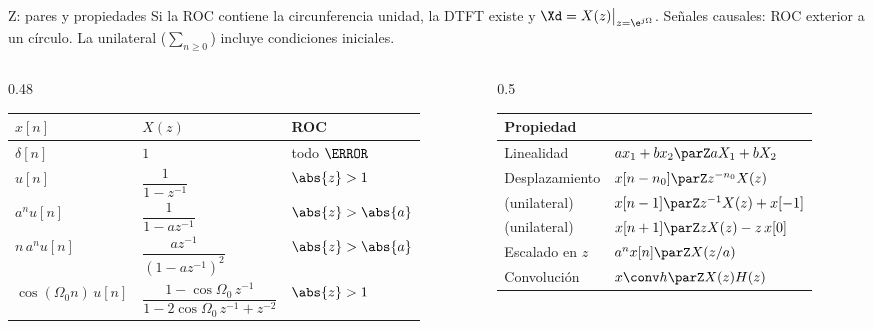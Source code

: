\documentclass[aspectratio=169,11pt]{beamer}
\begin{document}
\begin{frame}{Z: pares y propiedades}
  \small
  Si la ROC contiene la circunferencia unidad, la DTFT existe y $\Xd=X(z)\big|_{z=\e^{j\Omega}}$. Señales causales: ROC exterior a un círculo. La unilateral ($\sum_{n\ge0}$) incluye condiciones iniciales.
  \medskip
  \begin{columns}[T]
    \begin{column}{0.48\textwidth}
      \footnotesize
      \renewcommand{\arraystretch}{1.3}
      \begin{tabular}{@{}lll@{}}
        \toprule
        $x[n]$ & $X(z)$ & ROC\\\midrule
        $\delta[n]$ & $1$ & todo $\C$\\
        $u[n]$ & $\dfrac{1}{1-z^{-1}}$ & $\abs{z}>1$\\
        $a^nu[n]$ & $\dfrac{1}{1-az^{-1}}$ & $\abs{z}>\abs{a}$\\
        $n\,a^nu[n]$ & $\dfrac{az^{-1}}{(1-az^{-1})^2}$ & $\abs{z}>\abs{a}$\\
        $\cos(\Omega_0n)\,u[n]$ & $\dfrac{1-\cos\Omega_0\,z^{-1}}{1-2\cos\Omega_0\,z^{-1}+z^{-2}}$ & $\abs{z}>1$\\\bottomrule
      \end{tabular}
    \end{column}
    \begin{column}{0.5\textwidth}
      \footnotesize
      \renewcommand{\arraystretch}{1.3}
      \begin{tabular}{@{}ll@{}}
        \toprule
        Propiedad & \\\midrule
        Linealidad & $a x_1+b x_2\parZ aX_1+bX_2$\\
        Desplazamiento & $x[n-n_0]\parZ z^{-n_0}X(z)$\\
        \quad (unilateral) & $x[n-1]\parZ z^{-1}X(z)+x[-1]$\\
        \quad (unilateral) & $x[n+1]\parZ zX(z)-z\,x[0]$\\
        Escalado en $z$ & $a^nx[n]\parZ X(z/a)$\\
        \alert{Convolución} & $x\conv h\parZ X(z)H(z)$\\\bottomrule
      \end{tabular}
    \end{column}
  \end{columns}
\end{frame}
\end{document}
